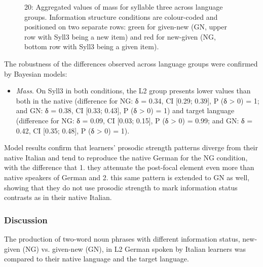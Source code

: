   
 

\begin{stylecaption}\begin{figure}
\caption{20: Aggregated values of mass for syllable three across language groups. Information structure conditions are colour-coded and positioned on two separate rows: green for given-new (GN, upper row with Syll3 being a new item) and red for new-given (NG, bottom row with Syll3 being a given item).}
\label{fig:key:2}
\end{figure}\end{stylecaption}

The robustness of the differences observed across language groups were confirmed by Bayesian models:

\begin{itemize}
\item \textit{Mass}. On Syll3 in both conditions, the L2 group presents lower values than both in the native (difference for NG: δ = 0.34, CI [0.29; 0.39], P (δ > 0) = 1; and GN: δ = 0.38, CI [0.33; 0.43], P (δ > 0) = 1) and target language (difference for NG: δ = 0.09, CI [0.03; 0.15], P (δ > 0) = 0.99; and GN: δ = 0.42, CI [0.35; 0.48], P (δ > 0) = 1).
\end{itemize}

Model results confirm that learners’ prosodic strength patterns diverge from their native Italian and tend to reproduce the native German for the NG condition, with the difference that 1. they attenuate the post-focal element even more than native speakers of German and 2. this same pattern is extended to GN as well, showing that they do not use prosodic strength to mark information status contrasts as in their native Italian. 

\subsubsection{Discussion}
\hypertarget{Toc191305914}{}
The production of two-word noun phrases with different information status, new-given (NG) vs. given-new (GN), in L2 German spoken by Italian learners was compared to their native language and the target language.

